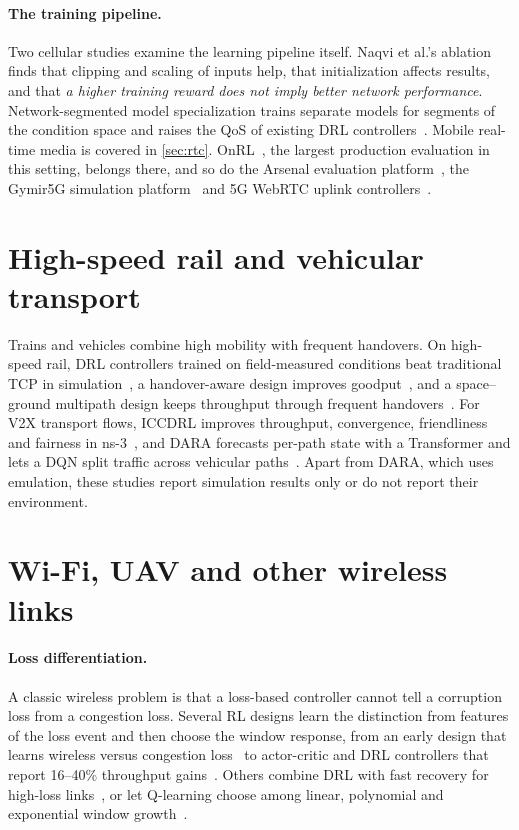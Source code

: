 \paragraph{The training pipeline.} Two cellular studies examine the learning pipeline itself. Naqvi et al.'s ablation~\cite{naqvi2022ablation} finds that clipping and scaling of inputs help, that initialization affects results, and that \emph{a higher training reward does not imply better network performance}. Network-segmented model specialization trains separate models for segments of the condition space and raises the QoS of existing DRL controllers~\cite{yao2025unified}. Mobile real-time media is covered in \cref{sec:rtc}. OnRL~\cite{zhang2020onrl}, the largest production evaluation in this setting, belongs there, and so do the Arsenal evaluation platform~\cite{zhang2021arsenal}, the Gymir5G simulation platform~\cite{smirnov2024gymir5g} and 5G WebRTC uplink controllers~\cite{smirnov2024real,liu2025research}.

\section{High-speed rail and vehicular transport}
\label{sec:hsr}

Trains and vehicles combine high mobility with frequent handovers. On high-speed rail, DRL controllers trained on field-measured conditions beat traditional TCP in simulation~\cite{cui2020improving}, a handover-aware design improves goodput~\cite{xu2020handover}, and a space--ground multipath design keeps throughput through frequent handovers~\cite{xu2021deep}. For V2X transport flows, ICCDRL improves throughput, convergence, friendliness and fairness in ns-3~\cite{wang2022intelligent}, and DARA forecasts per-path state with a Transformer and lets a DQN split traffic across vehicular paths~\cite{maglione2026deep}. Apart from DARA, which uses emulation, these studies report simulation results only or do not report their environment.

\section{Wi-Fi, UAV and other wireless links}
\label{sec:wifi}

\paragraph{Loss differentiation.} A classic wireless problem is that a loss-based controller cannot tell a corruption loss from a congestion loss. Several RL designs learn the distinction from features of the loss event and then choose the window response, from an early design that learns wireless versus congestion loss~\cite{rani2019reinforcement} to actor-critic and DRL controllers that report 16--40\% throughput gains~\cite{pradeep2021temporal,midhula2023adaptive}. Others combine DRL with fast recovery for high-loss links~\cite{cao2023drlfcc}, or let Q-learning choose among linear, polynomial and exponential window growth~\cite{molia2024reinforcement}.

